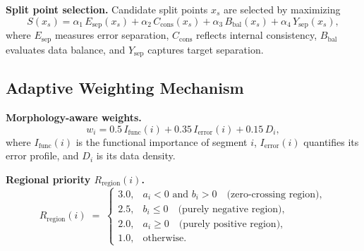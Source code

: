 \documentclass{article}
\theoremstyle{plain}
\theoremstyle{definition}
\theoremstyle{remark}
\begin{document}
\noindent\textbf{Split point selection.}
Candidate split points $x_s$ are selected by maximizing
\begin{equation}
S(x_s)
= \alpha_1\,E_{\mathrm{sep}}(x_s)
+ \alpha_2\,C_{\mathrm{cons}}(x_s)
+ \alpha_3\,B_{\mathrm{bal}}(x_s)
+ \alpha_4\,Y_{\mathrm{sep}}(x_s),
\end{equation}
where $E_{\mathrm{sep}}$ measures error separation, $C_{\mathrm{cons}}$ reflects
internal consistency, $B_{\mathrm{bal}}$ evaluates data balance, and $Y_{\mathrm{sep}}$
captures target separation.

\subsection{Adaptive Weighting Mechanism}

\noindent\textbf{Morphology-aware weights.}
\begin{equation}
w_i = 0.5\,I_{\mathrm{func}}(i) + 0.35\,I_{\mathrm{error}}(i) + 0.15\,D_i,
\end{equation}
where $I_{\mathrm{func}}(i)$ is the functional importance of segment $i$,
$I_{\mathrm{error}}(i)$ quantifies its error profile, and $D_i$ is its data density.

\noindent\textbf{Regional priority $R_{\mathrm{region}}(i)$.}
\begin{equation}
R_{\mathrm{region}}(i) \;=\;
\begin{cases}
3.0, & a_i < 0 \text{ and } b_i > 0 \quad \text{(zero-crossing region)},\\
2.5, & b_i \le 0 \quad \text{(purely negative region)},\\
2.0, & a_i \ge 0 \quad \text{(purely positive region)},\\
1.0, & \text{otherwise.}
\end{cases}
\end{equation}
\end{document}
